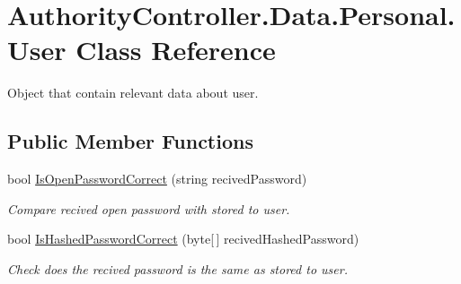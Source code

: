 \hypertarget{class_authority_controller_1_1_data_1_1_personal_1_1_user}{}\section{Authority\+Controller.\+Data.\+Personal.\+User Class Reference}
\label{class_authority_controller_1_1_data_1_1_personal_1_1_user}


Object that contain relevant data about user.  


\subsection*{Public Member Functions}
\begin{DoxyCompactItemize}
\item 
bool \mbox{\hyperlink{class_authority_controller_1_1_data_1_1_personal_1_1_user_a40e370338936914847b4ca8afb9cfc2f}{Is\+Open\+Password\+Correct}} (string recived\+Password)
\begin{DoxyCompactList}\small\item\em Compare recived open password with stored to user. \end{DoxyCompactList}\item 
bool \mbox{\hyperlink{class_authority_controller_1_1_data_1_1_personal_1_1_user_a3acdb952f59613bae8bf253a3cada496}{Is\+Hashed\+Password\+Correct}} (byte\mbox{[}$\,$\mbox{]} recived\+Hashed\+Password)
\begin{DoxyCompactList}\small\item\em Check does the recived password is the same as stored to user. \end{DoxyCompactList}\end{DoxyCompactItemize}
